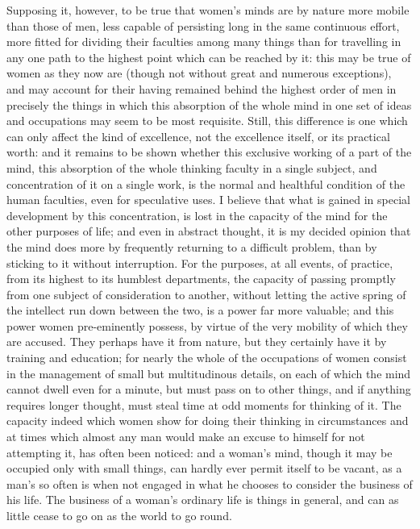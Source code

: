 \documentclass[12pt]{report}
\begin{document}
Supposing it, however, to be true that women's minds are by nature more mobile than those of men, less capable of persisting long in the same continuous effort, more fitted for dividing their faculties among many things than for travelling in any one path to the highest point which can be reached by it: this may be true of women as they now are (though not without great and numerous exceptions), and may account for their having remained behind the highest order of men in precisely the things in which this absorption of the whole mind in one set of ideas and occupations may seem to be most requisite. Still, this difference is one which can only affect the kind of excellence, not the excellence itself, or its practical worth: and it remains to be shown whether this exclusive working of a part of the mind, this absorption of the whole thinking faculty in a single subject, and concentration of it on a single work, is the normal and healthful condition of the human faculties, even for speculative uses. I believe that what is gained in special development by this concentration, is lost in the capacity of the mind for the other purposes of life; and even in abstract thought, it is my decided opinion that the mind does more by frequently returning to a difficult problem, than by sticking to it without interruption. For the purposes, at all events, of practice, from its highest to its humblest departments, the capacity of passing promptly from one subject of consideration to another, without letting the active spring of the intellect run down between the two, is a power far more valuable; and this power women pre-eminently possess, by virtue of the very mobility of which they are accused. They perhaps have it from nature, but they certainly have it by training and education; for nearly the whole of the occupations of women consist in the management of small but multitudinous details, on each of which the mind cannot dwell even for a minute, but must pass on to other things, and if anything requires longer thought, must steal time at odd moments for thinking of it. The capacity indeed which women show for doing their thinking in circumstances and at times which almost any man would make an excuse to himself for not attempting it, has often been noticed: and a woman's mind, though it may be occupied only with small things, can hardly ever permit itself to be vacant, as a man's so often is when not engaged in what he chooses to consider the business of his life. The business of a woman's ordinary life is things in general, and can as little cease to go on as the world to go round.
\end{document}
